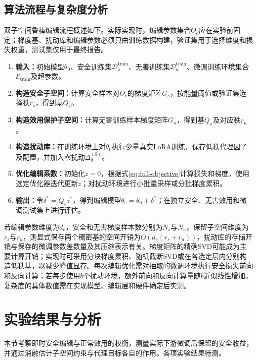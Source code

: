\subsection{算法流程与复杂度分析}

双子空间鲁棒编辑流程概述如下。实际实现时，编辑参数集合$\Theta_e$应在实验前固定；梯度基、扰动库和编辑参数必须只由训练数据构建，验证集用于选择维度和损失权重，测试集仅用于最终报告。

\begin{enumerate}
  \item \textbf{输入：}初始模型$\theta_0$、安全训练集$\mathcal{D}_{s}^{\mathrm{train}}$、无害训练集$\mathcal{D}_{u}^{\mathrm{train}}$、微调训练环境集合$\mathcal{E}_{\mathrm{train}}$及超参数。
  \item \textbf{构造安全子空间：}计算安全样本对$\Theta_e$的梯度矩阵$G_s$，按能量阈值或验证集选择秩$r_s$，得到基$Q_s$。
  \item \textbf{构造效用保护子空间：}计算无害训练样本梯度矩阵$G_u$，得到基$Q_u$及对应秩$r_u$。
  \item \textbf{构造扰动库：}在训练环境上对$\theta_0$执行少量真实LoRA训练，保存低秩代理因子及配置，并加入零扰动$\Delta_{0}^{(0)}$。
  \item \textbf{优化编辑系数：}初始化$z=0$，根据式\eqref{eq:full-objective}计算损失和梯度，使用选定优化器迭代更新$z$；对扰动环境进行小批量采样或分批梯度累积。
  \item \textbf{输出：}令$\delta^*=Q_s z^*$，得到编辑模型$\theta_e=\theta_0+\delta^*$；在独立安全、无害效用和微调测试集上进行评估。
\end{enumerate}

若编辑参数维度为$d_e$，安全和无害梯度样本数分别为$N_s$与$N_u$，保留子空间维度为$r_s$与$r_u$，则显式保存两个稠密基的空间开销为$O(d_e(r_s+r_u))$，扰动库的存储开销与保存的微调参数差数量及其压缩表示有关。梯度矩阵的精确SVD可能成为主要计算开销；实现时可采用分块梯度累积、随机截断SVD或在各选定层内分别构造低秩基，以减少峰值显存。每次编辑优化需对抽取的微调环境执行安全损失前向和反向计算；若每步使用$b$个扰动环境，额外前向和反向计算量随$b$近似线性增加。复杂度的具体数值需在实现模型、编辑层和硬件确定后实测。

\section{实验结果与分析}

本节考察即时安全编辑与正常效用的权衡，测量实际下游微调后保留的安全收益，并通过消融估计子空间约束与代理目标各自的作用。各项实验结果待测。

